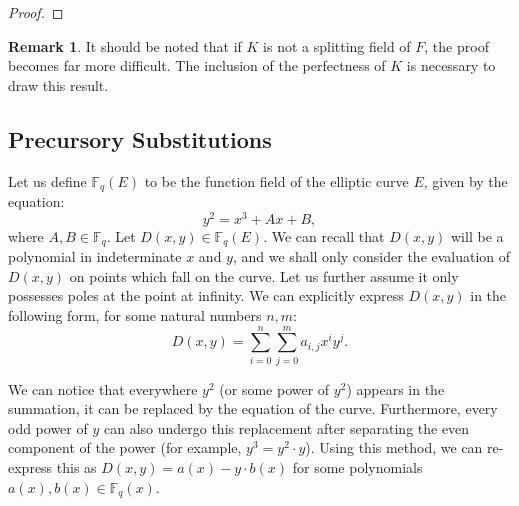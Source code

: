 \documentclass{article}
\theoremstyle{definition}
\newtheorem{remark}{Remark}
\newcommand{\6}{\mathbf}
\newcommand{\7}{\mathcal}
\begin{document}
\begin{proof}
    
\end{proof}



\begin{remark}
    It should be noted that if $K$ is not a splitting field of $F$, the proof becomes far more difficult. The inclusion of the perfectness of $K$ is necessary to draw this result.
\end{remark}


\subsection{Precursory Substitutions}

Let us define $\mathbb{F}_q(E)$ to be the function field of the elliptic curve $E$, given by the equation:
$$y^2 = x^3 + Ax + B,$$
where $A,B \in \mathbb{F}_q$. Let $D(x,y) \in \mathbb{F}_q(E)$. We can recall that $D(x,y)$ will be a polynomial in indeterminate $x$ and $y$, and we shall only consider the evaluation of $D(x,y)$ on points which fall on the curve. Let us further assume it only possesses poles at the point at infinity. We can explicitly express $D(x,y)$ in the following form, for some natural numbers $n,m$: 
$$D(x,y) = \sum_{i = 0}^n \sum_{j = 0}^m a_{i,j} x^i y^j.$$

We can notice that everywhere $y^2$ (or some power of $y^2$) appears in the summation, it can be replaced by the equation of the curve. Furthermore, every odd power of $y$ can also undergo this replacement after separating the even component of the power (for example, $y^3=y^2\cdot y$). Using this method, we can re-express this as $D(x,y) = a(x) - y \cdot b(x)$
for some polynomials $a(x),b(x) \in \mathbb{F}_q(x)$.
\end{document}
